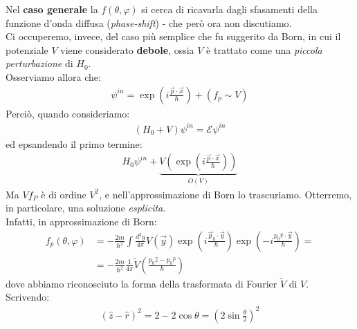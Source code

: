 \documentclass[../../FisicaTeorica.tex]{subfiles}
\begin{document}
Nel \textbf{caso generale} la $f(\theta,\varphi)$ si cerca di ricavarla dagli sfasamenti della funzione d'onda diffusa (\textit{phase-shift}) - che però ora non discutiamo.\\
Ci occuperemo, invece, del caso più semplice che fu suggerito da Born, in cui il potenziale $V$ viene considerato \textbf{debole}, ossia $V$ è trattato come una \textit{piccola perturbazione} di $H_0$.\\
Osserviamo allora che:
\begin{align*}
\psi^{in} = \exp\left(i\frac{\vec{p}\cdot \vec{x}}{\hbar}\right) + (f_p \sim V)
\end{align*}
Perciò, quando consideriamo:
\begin{align*}
(H_0 + V)\psi^{in} = \mathcal{E}\psi^{in}
\end{align*}
ed epsandendo il primo termine:
\begin{align*}
H_0 \psi^{in} + \underbrace{V\left( \exp\left(i\frac{\vec{p}\cdot \vec{x}}{\hbar}\right ) \right)}_{O(V)}
\end{align*}
Ma $V f_P$ è di ordine $V^2$, e nell'approssimazione di Born lo trascuriamo. Otterremo, in particolare, una soluzione \textit{esplicita}.\\

Infatti, in approssimazione di Born:
\begin{align*}
f_p(\theta,\varphi) &= -\frac{2m}{\hbar^2}\int \frac{d^3 y}{4\pi}V(\vec{y}) \exp\left(i\frac{\vec{p}_0 \cdot \vec{y}}{\hbar} \right) \exp\left(-i\frac{p_0 \hat{r}\cdot \vec{y}}{\hbar} \right) =\\
&=-\frac{2m}{\hbar^2} \frac{1}{4\pi} \tilde{V}\left(\frac{p_0 \hat{z} - p_0 \hat{r}}{\hbar}\right)
\end{align*}
dove abbiamo riconosciuto la forma della trasformata di Fourier $\tilde{V}$ di $V$.\\
Scrivendo:
\begin{align*}
(\hat{z}-\hat{r})^2 = 2- 2\cos\theta = \left( 2\sin\frac{\theta}{2}\right)^2
\end{align*}
\end{document}
